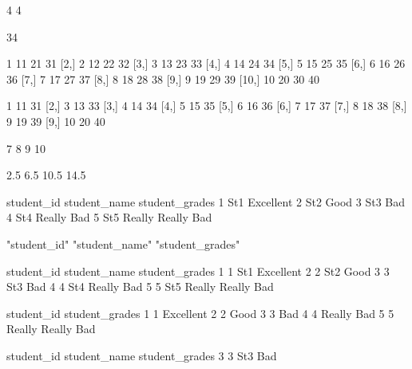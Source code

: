 \documentclass{article}
\begin{document}
\begin{Schunk}
\begin{Soutput}
[1] 4 4
\end{Soutput}
\begin{Soutput}
[1] 34
\end{Soutput}
\begin{Soutput}
      [,1] [,2] [,3] [,4]
 [1,]    1   11   21   31
 [2,]    2   12   22   32
 [3,]    3   13   23   33
 [4,]    4   14   24   34
 [5,]    5   15   25   35
 [6,]    6   16   26   36
 [7,]    7   17   27   37
 [8,]    8   18   28   38
 [9,]    9   19   29   39
[10,]   10   20   30   40
\end{Soutput}
\begin{Soutput}
      [,1] [,2] [,3]
 [1,]    1   11   31
 [2,]    3   13   33
 [3,]    4   14   34
 [4,]    5   15   35
 [5,]    6   16   36
 [6,]    7   17   37
 [7,]    8   18   38
 [8,]    9   19   39
 [9,]   10   20   40
\end{Soutput}
\begin{Soutput}
[1]  7  8  9 10
\end{Soutput}
\begin{Soutput}
[1]  2.5  6.5 10.5 14.5
\end{Soutput}
\begin{Soutput}
 student_id student_name    student_grades
          1          St1         Excellent
          2          St2              Good
          3          St3               Bad
          4          St4        Really Bad
          5          St5 Really Really Bad
\end{Soutput}
\begin{Soutput}
[1] "student_id"     "student_name"   "student_grades"
\end{Soutput}
\begin{Soutput}
  student_id student_name    student_grades
1          1          St1         Excellent
2          2          St2              Good
3          3          St3               Bad
4          4          St4        Really Bad
5          5          St5 Really Really Bad
\end{Soutput}
\begin{Soutput}
  student_id    student_grades
1          1         Excellent
2          2              Good
3          3               Bad
4          4        Really Bad
5          5 Really Really Bad
\end{Soutput}
\begin{Soutput}
  student_id student_name student_grades
3          3          St3            Bad
\end{Soutput}
\begin{Soutput}

\end{Soutput}
\end{Schunk}
\end{document}
